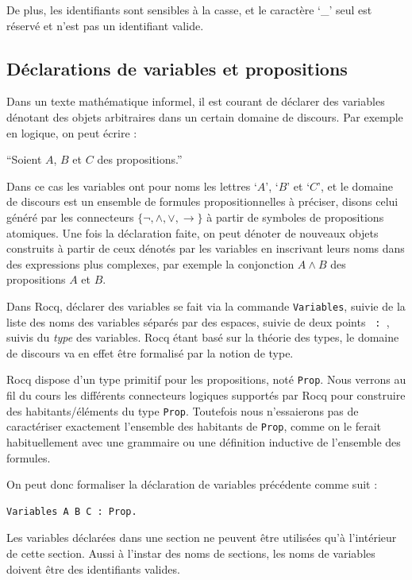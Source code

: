 \documentclass[11pt,a4paper]{article}
\begin{document}
De plus, les identifiants sont sensibles à la casse, et le caractère `\_' seul est réservé et n'est pas un identifiant valide.

\subsection*{Déclarations de variables et propositions}

Dans un texte mathématique informel, il est courant de déclarer des variables dénotant des objets arbitraires dans un certain domaine de discours. Par exemple en logique, on peut écrire :

\begin{center}
  ``Soient $A$, $B$ et $C$ des propositions.''
\end{center}

Dans ce cas les variables ont pour noms les lettres `$A$', `$B$' et `$C$', et le domaine de discours est un ensemble de formules propositionnelles à préciser, disons celui généré par les connecteurs $\{\neg, \land, \lor, \to\}$ à partir de symboles de propositions atomiques. Une fois la déclaration faite, on peut dénoter de nouveaux objets construits à partir de ceux dénotés par les variables en inscrivant leurs noms dans des expressions plus complexes, par exemple la conjonction $A \land B$ des propositions $A$ et $B$.

Dans Rocq, déclarer des variables se fait via la commande \texttt{Variables}, suivie de la liste des noms des variables séparés par des espaces, suivie de deux points \texttt{ : }, suivis du \emph{type} des variables. Rocq étant basé sur la théorie des types, le domaine de discours va en effet être formalisé par la notion de type.

Rocq dispose d'un type primitif pour les propositions, noté \texttt{Prop}. Nous verrons au fil du cours les différents connecteurs logiques supportés par Rocq pour construire des habitants/éléments du type \texttt{Prop}. Toutefois nous n'essaierons pas de caractériser exactement l'ensemble des habitants de \texttt{Prop}, comme on le ferait habituellement avec une grammaire ou une définition inductive de l'ensemble des formules.

On peut donc formaliser la déclaration de variables précédente comme suit :

\begin{lstlisting}
Variables A B C : Prop.
\end{lstlisting}

\begin{remarque}{}{}
  Les variables déclarées dans une section ne peuvent être utilisées qu'à l'intérieur de cette section. Aussi à l'instar des noms de sections, les noms de variables doivent être des identifiants valides.
\end{remarque}
\end{document}

